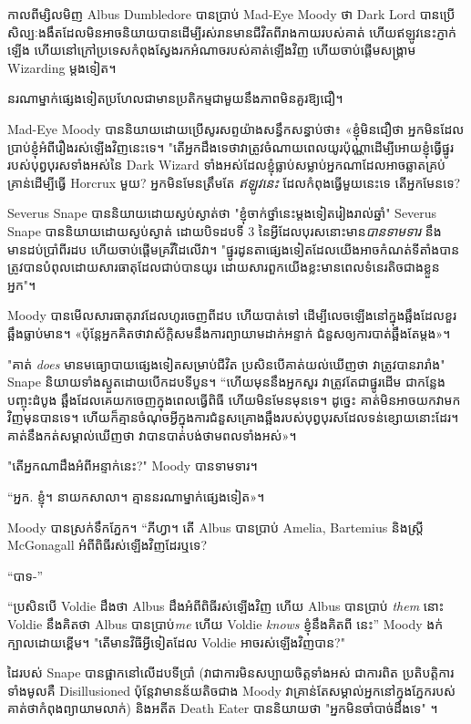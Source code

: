 {{{{{{កាលពីម្សិលមិញ Albus Dumbledore បានប្រាប់ Mad-Eye Moody ថា Dark Lord បានប្រើសិល្បៈងងឹតដែលមិនអាចនិយាយបានដើម្បីរស់រានមានជីវិតពីរាងកាយរបស់គាត់ ហើយឥឡូវនេះភ្ញាក់ឡើង ហើយនៅក្រៅប្រទេសកំពុងស្វែងរកអំណាចរបស់គាត់ឡើងវិញ ហើយចាប់ផ្តើមសង្គ្រាម Wizarding ម្តងទៀត។

នរណាម្នាក់ផ្សេងទៀតប្រហែលជាមានប្រតិកម្មជាមួយនឹងភាពមិនគួរឱ្យជឿ។

Mad-Eye Moody បាន​និយាយ​ដោយ​ប្រើ​សូរសព្ទ​យ៉ាង​សន្ធឹក​សន្ធាប់​ថា៖ «ខ្ញុំ​មិន​ជឿ​ថា អ្នក​មិន​ដែល​ប្រាប់​ខ្ញុំ​អំពី​រឿង​រស់​ឡើង​វិញ​នេះ​ទេ។ "តើអ្នកដឹងទេថាវាត្រូវចំណាយពេលយូរប៉ុណ្ណាដើម្បីអោយខ្ញុំធ្វើផ្នូររបស់បុព្វបុរសទាំងអស់នៃ Dark Wizard ទាំងអស់ដែលខ្ញុំធ្លាប់សម្លាប់អ្នកណាដែលអាចឆ្លាតគ្រប់គ្រាន់ដើម្បីធ្វើ Horcrux មួយ? អ្នកមិនមែនត្រឹមតែ \emph{ឥឡូវនេះ} ដែលកំពុងធ្វើមួយនេះទេ តើអ្នកមែនទេ?

Severus Snape បាននិយាយដោយស្ងប់ស្ងាត់ថា "ខ្ញុំចាក់ថ្នាំនេះម្តងទៀតរៀងរាល់ឆ្នាំ" Severus Snape បាននិយាយដោយស្ងប់ស្ងាត់ ដោយបិទដបទី 3 នៃអ្វីដែលបុរសនោះមាន\emph{បានទាមទារ} នឹងមានដប់ប្រាំពីរដប ហើយចាប់ផ្តើមគ្រវីដៃលើវា។ "ផ្នូរដូនតាផ្សេងទៀតដែលយើងអាចកំណត់ទីតាំងបានត្រូវបានបំពុលដោយសារធាតុដែលជាប់បានយូរ ដោយសារពួកយើងខ្លះមានពេលទំនេរតិចជាងខ្លួនអ្នក"។

Moody បានមើលសារធាតុរាវដែលហូរចេញពីដប ហើយបាត់ទៅ ដើម្បីលេចឡើងនៅក្នុងឆ្អឹងដែលខួរឆ្អឹងធ្លាប់មាន។ «​ប៉ុន្តែ​អ្នក​គិត​ថា​វា​ស័ក្តិសម​នឹង​ការ​ព្យាយាម​ដាក់​អន្ទាក់ ជំនួស​ឲ្យ​ការ​បាត់​ឆ្អឹង​តែ​ម្តង»។

"គាត់ \emph{does} មានមធ្យោបាយផ្សេងទៀតសម្រាប់ជីវិត ប្រសិនបើគាត់យល់ឃើញថា វាត្រូវបានរារាំង" Snape និយាយទាំងស្ងួតដោយបើកដបទីបួន។ “ហើយ​មុន​នឹង​អ្នក​សួរ វា​ត្រូវ​តែ​ជា​ផ្នូរ​ដើម ជា​កន្លែង​បញ្ចុះ​ដំបូង ឆ្អឹង​ដែល​គេ​យក​ចេញ​ក្នុង​ពេល​ធ្វើ​ពិធី ហើយ​មិន​មែន​មុន​ទេ។ ដូច្នេះ គាត់​មិន​អាច​យក​វា​មក​វិញ​មុន​បាន​ទេ។ ហើយ​ក៏​គ្មាន​ចំណុច​អ្វី​ក្នុង​ការ​ជំនួស​គ្រោង​ឆ្អឹង​របស់​បុព្វបុរស​ដែល​ទន់ខ្សោយ​នោះ​ដែរ។ គាត់​នឹង​កត់​សម្គាល់​ឃើញ​ថា វា​បាន​បាត់​បង់​ថាមពល​ទាំង​អស់»។

"តើអ្នកណាដឹងអំពីអន្ទាក់នេះ?" Moody បានទាមទារ។

“អ្នក. ខ្ញុំ។ នាយកសាលា។ គ្មាន​នរណា​ម្នាក់​ផ្សេង​ទៀត»។

Moody បានស្រក់ទឹកភ្នែក។ “ភីហ្វា។ តើ Albus បានប្រាប់ Amelia, Bartemius និងស្ត្រី McGonagall អំពីពិធីរស់ឡើងវិញដែរឬទេ?

“បាទ-”

“ប្រសិនបើ Voldie ដឹងថា Albus ដឹងអំពីពិធីរស់ឡើងវិញ ហើយ Albus បានប្រាប់ \emph{ them} នោះ Voldie នឹងគិតថា Albus បានប្រាប់\emph{me} ហើយ Voldie \emph{knows} ខ្ញុំនឹងគិតពី នេះ” Moody ងក់ក្បាលដោយខ្ពើម។ "តើមានវិធីអ្វីទៀតដែល Voldie អាចរស់ឡើងវិញបាន?"

ដៃរបស់ Snape បានផ្អាកនៅលើដបទីប្រាំ (វាជាការមិនសប្បាយចិត្តទាំងអស់ ជាការពិត ប្រតិបត្តិការទាំងមូលគឺ Disillusioned ប៉ុន្តែវាមានន័យតិចជាង Moody វាគ្រាន់តែសម្គាល់អ្នកនៅក្នុងភ្នែករបស់គាត់ថាកំពុងព្យាយាមលាក់) និងអតីត Death Eater បាននិយាយថា "អ្នកមិនចាំបាច់ដឹងទេ" ។

}}}}}}
